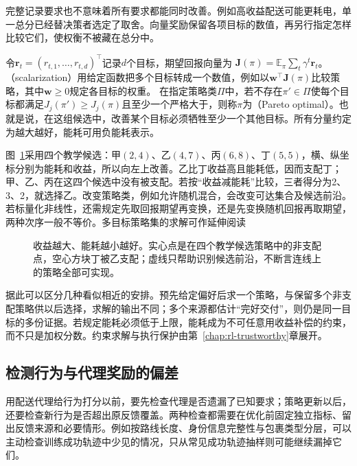 完整记录要求也不意味着所有要求都能同时改善。例如高收益配送可能更耗电，单一总分已经替决策者选定了取舍。向量奖励保留各项目标的数值，再另行指定怎样比较它们，使权衡不被藏在总分中。

\begin{definition}
  \label{def:rl-reward-pareto}
  令$\bm r_t=(r_{t,1},\ldots,r_{t,d})^\top$记录$d$个目标，期望回报向量为
  $\bm J(\pi)=\mathbb E_\pi\sum_t\gamma^t\bm r_t$。
  （scalarization）用给定函数把多个目标转成一个数值，例如以$\bm w^\top\bm J(\pi)$比较策略，其中$\bm w\geq0$规定各目标的权重。
  在指定策略类$\Pi$中，若不存在$\pi'\in\Pi$使每个目标都满足$J_j(\pi')\geq J_j(\pi)$且至少一个严格大于，则称$\pi$为（Pareto optimal）。也就是说，在这组候选中，改善某个目标必须牺牲至少一个其他目标。所有分量约定为越大越好，能耗可用负能耗表示。
\end{definition}

图~\ref{fig:rl-reward-pareto}采用四个教学候选：甲$(2,4)$、乙$(4,7)$、丙$(6,8)$、丁$(5,5)$，横、纵坐标分别为能耗和收益，所以向左上改善。乙比丁收益高且能耗低，因而支配丁；甲、乙、丙在这四个候选中没有被支配。若按“收益减能耗”比较，三者得分为2、3、2，就选择乙。改变策略类，例如允许随机混合，会改变可达集合及候选前沿。若标量化非线性，还需规定先取回报期望再变换，还是先变换随机回报再取期望，两种次序一般不等价。多目标策略集的求解可作延伸阅读

\begin{figure}[htbp]
  \centering
  
  \caption{收益越大、能耗越小越好。实心点是在四个教学候选策略中的非支配点，空心方块丁被乙支配；虚线只帮助识别候选前沿，不断言连线上的策略全部可实现。}
  \label{fig:rl-reward-pareto}
\end{figure}

据此可以区分几种看似相近的安排。预先给定偏好后求一个策略，与保留多个非支配策略供以后选择，求解的输出不同；多个来源都估计“完好交付”，则仍是同一目标的多份证据。若规定能耗必须低于上限，能耗成为不可任意用收益补偿的约束，而不只是加权分数。约束求解与执行保护由第~\ref{chap:rl-trustworthy}章展开。

\subsection{检测行为与代理奖励的偏差}
\label{sec:rl-reward-detection}

用配送代理给行为打分以前，要先检查代理是否遗漏了已知要求；策略更新以后，还要检查新行为是否超出原反馈覆盖。两种检查都需要在优化前固定独立指标、留出反馈来源和必要情形。例如按路线长度、身份信息完整性与包裹类型分层，可以主动检查训练成功轨迹中少见的情况，只从常见成功轨迹抽样则可能继续漏掉它们。

